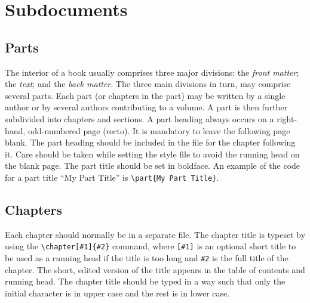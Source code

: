 \section{Subdocuments}
\subsection{Parts}
The interior of a book usually comprises three major divisions: the
{\it front matter}; the {\it text}; and the {\it back matter}. The
three main divisions in turn, may comprise several parts. Each part
(or chapters in the part) may be written by a single author or by
several authors contributing to a volume. A part is then further
subdivided into chapters and sections. A part heading always occurs
on a right-hand, odd-numbered page (recto). It is mandatory to leave
the following page blank. The part heading should be included in the
file for the chapter following it. Care should be taken while
setting the style file to avoid the running head on the blank page.
The part title should be set in boldface. An example of the code for
a part title ``My Part Title'' is \verb|\part{My Part Title}|.

\subsection{Chapters}
Each chapter should normally be in a separate file. The chapter
title is typeset by using the \verb|\chapter[#1]{#2}| command, where
\verb|[#1]| is an optional short title to be used as a running head
if the title is too long and \verb|#2| is the full title of the
chapter. The short, edited version of the title appears in the table
of contents and running head. The chapter title should be typed in a
way such that only the initial character is in upper case and the
rest is in lower case.

